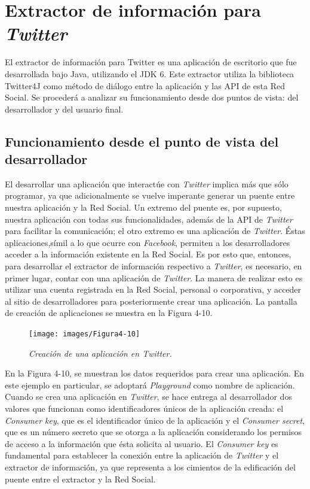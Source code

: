 \section{Extractor de información para \textit{Twitter}}

El extractor de información para Twitter es una aplicación de escritorio que fue desarrollada bajo Java, utilizando el JDK 6. Este extractor utiliza la biblioteca Twitter4J como método de diálogo entre la aplicación y las API de esta Red Social. Se procederá a analizar su funcionamiento desde dos puntos de vista: del desarrollador y del usuario final.

\subsection{Funcionamiento desde el punto de vista del desarrollador}

El desarrollar una aplicación que interactúe con \textit{Twitter} implica más que sólo programar, ya que adicionalmente se vuelve imperante generar un puente entre nuestra aplicación y la Red Social. Un extremo del puente es, por supuesto, nuestra aplicación con todas sus funcionalidades, además de la API de \textit{Twitter} para facilitar la comunicación; el otro extremo es una aplicación de \textit{Twitter}. Éstas aplicaciones,símil a lo que ocurre con \textit{Facebook}, permiten a los desarrolladores acceder a la información existente en la Red Social. Es por esto que, entonces, para desarrollar el extractor de información respectivo a \textit{Twitter}, es necesario, en primer lugar, contar con una aplicación de \textit{Twitter}. La manera de realizar esto es utilizar una cuenta registrada en la Red Social, personal o corporativa, y acceder al sitio de desarrolladores para posteriormente crear una aplicación. La pantalla de creación de aplicaciones se muestra en la Figura 4-10.

\begin{figure}[h]
	\centering
	\texttt{[image: images/Figura4-10]}
	\caption{\em Creación de una aplicación en Twitter.}
	\label{fig:ext-im10}
\end{figure}

En la Figura 4-10, se muestran los datos requeridos para crear una aplicación. En este ejemplo en particular, se adoptará \textit{Playground} como nombre de aplicación. 
Cuando se crea una aplicación en \textit{Twitter}, se hace entrega al desarrollador dos valores que funcionan como identificadores únicos de la aplicación creada: el \textit{Consumer key}, que es el identificador único de la aplicación y el \textit{Consumer secret}, que es un número secreto que se otorga a la aplicación considerando los permisos de acceso a la información que ésta solicita al usuario. El \textit{Consumer key} es fundamental para establecer la conexión entre la aplicación de \textit{Twitter} y el extractor de información, ya que representa a los cimientos de la edificación del puente entre el extractor y la Red Social.

